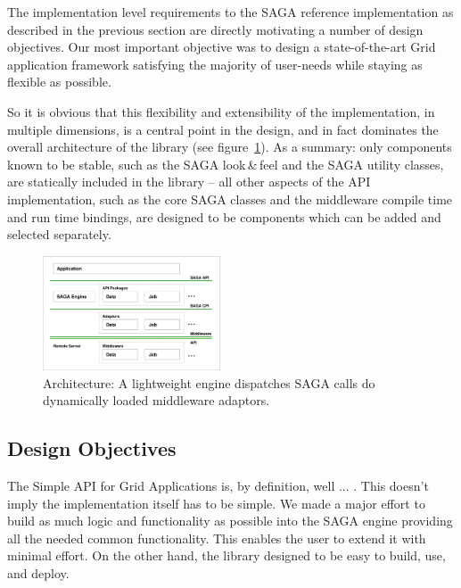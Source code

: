 
The implementation level requirements to the SAGA reference
implementation as described in the previous section are directly
motivating a number of design objectives. Our most important objective was to 
design a state-of-the-art Grid application framework satisfying the majority 
of user-needs while staying as flexible as possible. 

So it is obvious that this flexibility and extensibility of the implementation, 
in multiple dimensions, is a central point in the design, and in fact dominates
the overall architecture of the library (see figure~\ref{fig:archi}).  As
a summary: only components known to be stable, such as the SAGA
look\,\&\,feel and the SAGA utility classes, are statically included
in the library -- all other aspects of the API implementation, such as
the core SAGA classes and the middleware compile time and run time
bindings, are designed to be components which can be added and
selected separately.

\begin{figure}[!ht]
 \begin{center}
  \includegraphics[width=0.47\textwidth]{images/saga_architecture}
  \caption{\label{fig:archi}
    Architecture: A lightweight engine dispatches SAGA 
    calls do dynamically loaded middleware adaptors.}
 \end{center}
\end{figure}

\subsection{Design Objectives}

	The Simple API for Grid Applications is, by definition, well ... . 
	This doesn't imply the implementation itself has to be simple. We made a major 
	effort to build	as much logic and functionality as possible into the 
	SAGA engine providing all the needed common functionality. This	enables the 
	user to extend it with minimal effort. On the other hand, 
	the library  designed to be easy to build, use, and deploy. 
	

